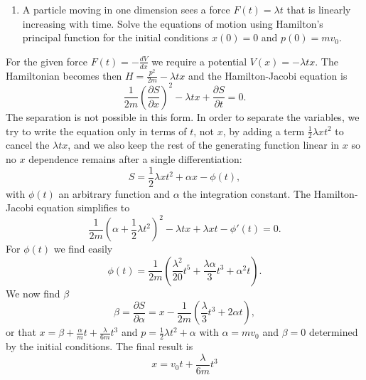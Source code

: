 \documentclass[letterpaper,11pt]{article}
\begin{document}
\begin{enumerate}[resume]
 \item A particle moving in one dimension sees a force $F(t) = \lambda t$ that is linearly increasing with time.  Solve the equations of motion using Hamilton's principal function for the initial conditions $x(0) = 0$ and $p(0) = mv_0$.
\end{enumerate}

For the given force $F(t) = -\frac{dV}{dx}$ we require a potential $V(x) = -\lambda tx$.  The Hamiltonian becomes then $H = \frac{p^2}{2m} - \lambda tx$ and the Hamilton-Jacobi equation is
\begin{equation*}
 \frac{1}{2m}\left(\frac{\partial S}{\partial x}\right)^2 - \lambda tx + \frac{\partial S}{\partial t} = 0.
\end{equation*}
The separation is not possible in this form.  In order to separate the variables, we try to write the equation only in terms of $t$, not $x$, by adding a term $\frac{1}{2} \lambda xt^2$ to cancel the $\lambda tx$, and we also keep the rest of the generating function linear in $x$ so no $x$ dependence remains after a single differentiation:
\begin{equation*}
 S = \frac{1}{2} \lambda xt^2 + \alpha x - \phi(t),
\end{equation*}
with $\phi(t)$ an arbitrary function and $\alpha$ the integration constant.  The Hamilton-Jacobi equation simplifies to
\begin{equation*}
 \frac{1}{2m} \left( \alpha + \frac{1}{2} \lambda t^2 \right)^2 - \lambda tx + \lambda xt - \phi'(t) = 0.
\end{equation*}
For $\phi(t)$ we find easily
\begin{equation*}
 \phi(t) = \frac{1}{2m} \left( \frac{\lambda^2}{20} t^5 + \frac{\lambda \alpha}{3} t^3 + \alpha^2 t \right).
\end{equation*}
We now find $\beta$
\begin{equation*}
 \beta = \frac{\partial S}{\partial \alpha} = x - \frac{1}{2m} \left(\frac{\lambda}{3} t^3 + 2 \alpha t \right),
\end{equation*}
or that $x = \beta + \frac{\alpha}{m} t + \frac{\lambda}{6m} t^3$ and $p = \frac{1}{2}\lambda t^2 + \alpha$ with $\alpha = mv_0$ and $\beta = 0$ determined by the initial conditions.  The final result is
\begin{equation*}
 x = v_0 t + \frac{\lambda}{6m} t^3
\end{equation*}
\end{document}
